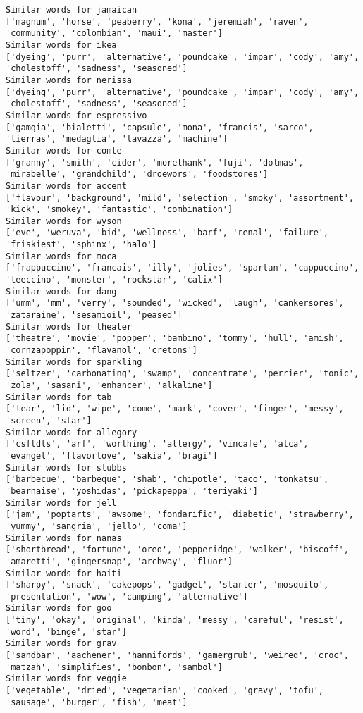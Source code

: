\documentclass[11pt]{article}
\begin{document}
\begin{Verbatim}[commandchars=\\\{\}]
Similar words for jamaican
['magnum', 'horse', 'peaberry', 'kona', 'jeremiah', 'raven', 'community', 'colombian', 'maui', 'master']
Similar words for ikea
['dyeing', 'purr', 'alternative', 'poundcake', 'impar', 'cody', 'amy', 'cholestoff', 'sadness', 'seasoned']
Similar words for nerissa
['dyeing', 'purr', 'alternative', 'poundcake', 'impar', 'cody', 'amy', 'cholestoff', 'sadness', 'seasoned']
Similar words for espressivo
['gamgia', 'bialetti', 'capsule', 'mona', 'francis', 'sarco', 'tierras', 'medaglia', 'lavazza', 'machine']
Similar words for comte
['granny', 'smith', 'cider', 'morethank', 'fuji', 'dolmas', 'mirabelle', 'grandchild', 'droewors', 'foodstores']
Similar words for accent
['flavour', 'background', 'mild', 'selection', 'smoky', 'assortment', 'kick', 'smokey', 'fantastic', 'combination']
Similar words for wyson
['eve', 'weruva', 'bid', 'wellness', 'barf', 'renal', 'failure', 'friskiest', 'sphinx', 'halo']
Similar words for moca
['frappuccino', 'francais', 'illy', 'jolies', 'spartan', 'cappuccino', 'teeccino', 'monster', 'rockstar', 'calix']
Similar words for dang
['umm', 'mm', 'verry', 'sounded', 'wicked', 'laugh', 'cankersores', 'zataraine', 'sesamioil', 'peased']
Similar words for theater
['theatre', 'movie', 'popper', 'bambino', 'tommy', 'hull', 'amish', 'cornzapoppin', 'flavanol', 'cretons']
Similar words for sparkling
['seltzer', 'carbonating', 'swamp', 'concentrate', 'perrier', 'tonic', 'zola', 'sasani', 'enhancer', 'alkaline']
Similar words for tab
['tear', 'lid', 'wipe', 'come', 'mark', 'cover', 'finger', 'messy', 'screen', 'star']
Similar words for allegory
['csftdls', 'arf', 'worthing', 'allergy', 'vincafe', 'alca', 'evangel', 'flavorlove', 'sakia', 'bragi']
Similar words for stubbs
['barbecue', 'barbeque', 'shab', 'chipotle', 'taco', 'tonkatsu', 'bearnaise', 'yoshidas', 'pickapeppa', 'teriyaki']
Similar words for jell
['jam', 'poptarts', 'awsome', 'fondarific', 'diabetic', 'strawberry', 'yummy', 'sangria', 'jello', 'coma']
Similar words for nanas
['shortbread', 'fortune', 'oreo', 'pepperidge', 'walker', 'biscoff', 'amaretti', 'gingersnap', 'archway', 'fluor']
Similar words for haiti
['sharpy', 'snack', 'cakepops', 'gadget', 'starter', 'mosquito', 'presentation', 'wow', 'camping', 'alternative']
Similar words for goo
['tiny', 'okay', 'original', 'kinda', 'messy', 'careful', 'resist', 'word', 'binge', 'star']
Similar words for grav
['sandbar', 'aachener', 'hannifords', 'gamergrub', 'weired', 'croc', 'matzah', 'simplifies', 'bonbon', 'sambol']
Similar words for veggie
['vegetable', 'dried', 'vegetarian', 'cooked', 'gravy', 'tofu', 'sausage', 'burger', 'fish', 'meat']

\end{Verbatim}
\end{document}
